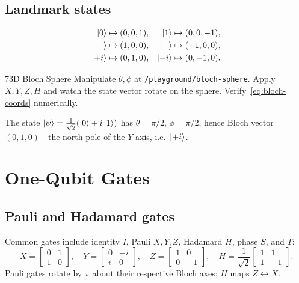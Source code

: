 \subsection{Landmark states}

\begin{align*}
\ket{0} &\mapsto (0,0,1), & \ket{1} &\mapsto (0,0,-1), \\
\ket{+} &\mapsto (1,0,0), & \ket{-} &\mapsto (-1,0,0), \\
\ket{+i} &\mapsto (0,1,0), & \ket{-i} &\mapsto (0,-1,0).
\end{align*}

\begin{labbox}{7}{3D Bloch Sphere}
Manipulate $\theta,\phi$ at \texttt{/playground/bloch-sphere}. Apply $X,Y,Z,H$ and watch the state vector rotate on the sphere. Verify~\eqref{eq:bloch-coords} numerically.
\end{labbox}

\begin{example}
The state $\ket{\psi}=\frac{1}{\sqrt{2}}(\ket{0}+i\ket{1})$ has $\theta=\pi/2$, $\phi=\pi/2$, hence Bloch vector $(0,1,0)$---the north pole of the $Y$ axis, i.e.\ $\ket{+i}$.
\end{example}

\section{One-Qubit Gates}
\label{sec:one-qubit-gates}

\subsection{Pauli and Hadamard gates}

Common gates include identity $I$, Pauli $X,Y,Z$, Hadamard $H$, phase $S$, and $T$:
\begin{equation}
X=\begin{bmatrix}0&1\\1&0\end{bmatrix},\quad
Y=\begin{bmatrix}0&-i\\i&0\end{bmatrix},\quad
Z=\begin{bmatrix}1&0\\0&-1\end{bmatrix},\quad
H=\frac{1}{\sqrt{2}}\begin{bmatrix}1&1\\1&-1\end{bmatrix}.
\label{eq:pauli-h}
\end{equation}
Pauli gates rotate by $\pi$ about their respective Bloch axes; $H$ maps $Z\leftrightarrow X$.

